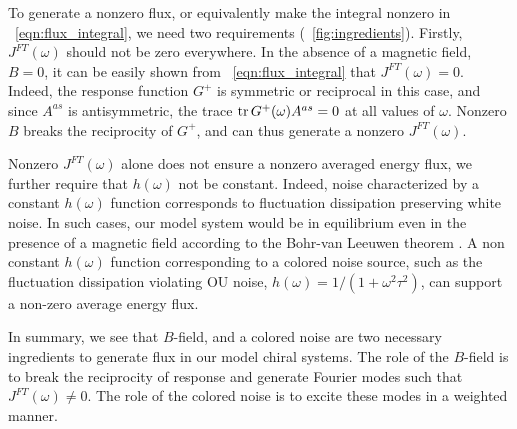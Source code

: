 \documentclass[
 preprint,
 preprintnumbers,
 amsmath,amssymb,
 aps,
 pre,
 longbibliography,
 superscriptaddress,
 10pt, twocolumn
]{revtex4-1}
\begin{document}
To generate a nonzero flux, or equivalently make the integral nonzero in \eqnname~\eqref{eqn:flux_integral}, we need two requirements (\figurename~\ref{fig:ingredients}).
Firstly, $J^{FT}(\omega)$ should not be zero everywhere.
In the absence of a magnetic field, $B=0$, it can be easily shown from \eqnname~\ref{eqn:flux_integral} that $J^{FT}(\omega)=0$. Indeed, the response function $G^+$ is symmetric or reciprocal in this case, and since $A^{as}$ is antisymmetric, the trace $\tr G^+(\omega) A^{as}=0$ at all values of $\omega$. Nonzero $B$ breaks the reciprocity of $G^+$, and can thus generate a nonzero $J^{FT}(\omega)$. 

Nonzero $J^{FT}(\omega)$ alone does not ensure a nonzero averaged energy flux, we further require that $h(\omega)$ not be constant.
Indeed, noise characterized by a constant $h(\omega)$ function corresponds to fluctuation dissipation preserving white noise. In such cases, our model system would be in equilibrium even in the presence of a magnetic field according to the Bohr-van Leeuwen theorem \cite{Pradhan2010NonexistenceClassical}.
A non constant $h(\omega)$ function corresponding to a colored noise source, such as the fluctuation dissipation violating OU noise, $h(\omega)=1/(1+\omega^2\tau^2)$, can support a non-zero average energy flux. 

In summary, we see that $B$-field, and a colored noise are two necessary ingredients to generate flux in our model chiral systems.
The role of the $B$-field is to break the reciprocity of response and generate Fourier modes such that $J^{FT}(\omega)\neq 0$. The role of the colored noise is to excite these modes in a weighted manner.
\end{document}

